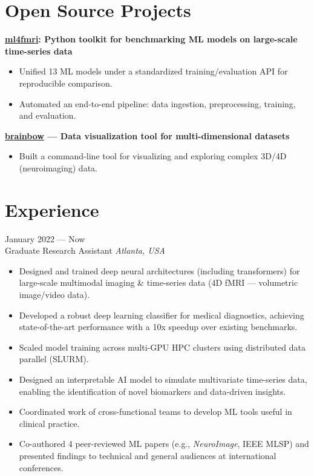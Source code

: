 \documentclass[11pt,a4paper]{article}
\begin{document}
\section*{Open Source Projects}
\noindent\textbf{\href{https://pypi.org/project/ml4fmri/}{ml4fmri}: Python toolkit for benchmarking ML models on large-scale time-series data}\\
[-2em]
\begin{itemize}[leftmargin=*,noitemsep]
    \item Unified 13 ML models under a standardized training/evaluation API for reproducible comparison.
    \item Automated an end-to-end pipeline: data ingestion, preprocessing, training, and evaluation.
\end{itemize}

\noindent\textbf{\href{https://pypi.org/project/brainbow/}{brainbow} --- Data visualization tool for multi-dimensional datasets}\\
[-2em]
\begin{itemize}[leftmargin=*,noitemsep]
    \item Built a command-line tool for visualizing and exploring complex 3D/4D (neuroimaging) data.
\end{itemize}

\section*{Experience}
 \hfill January 2022 --- Now\\
Graduate Research Assistant \hfill \textit{Atlanta, USA}\\
[-2em]
\begin{itemize}[leftmargin=*,noitemsep]
    \item Designed and trained deep neural architectures (including transformers) for large-scale multimodal imaging \& time-series data (4D fMRI --- volumetric image/video data).
    \item Developed a robust deep learning classifier for medical diagnostics, achieving state-of-the-art performance with a 10x speedup over existing benchmarks.
    \item Scaled model training across multi-GPU HPC clusters using distributed data parallel (SLURM).
    \item Designed an interpretable AI model to simulate multivariate time-series data, enabling the identification of novel biomarkers and data-driven insights.
    \item Coordinated work of cross-functional teams to develop ML tools useful in clinical practice.
    \item Co-authored 4 peer-reviewed ML papers (e.g., \textit{NeuroImage}, IEEE MLSP) and presented findings to technical and general audiences at international conferences.
\end{itemize}
\end{document}
